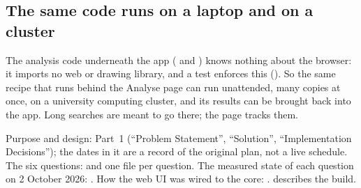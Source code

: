 \subsection*{The same code runs on a laptop and on a cluster}
The analysis code underneath the app ( and ) knows nothing
about the browser: it imports no web or drawing library, and a test enforces this
(). So the same recipe that runs behind the Analyse
page can run unattended, many copies at once, on a university computing cluster, and its
results can be brought back into the app. Long searches are meant to go there; the
 page tracks them.

\begin{underthehood}
Purpose and design:  Part~1 (``Problem Statement'',
``Solution'', ``Implementation Decisions''); the dates in it are a record of the original
plan, not a live schedule. The six questions:  and one file
per question. The measured state of each question on 2 October 2026:
. How the web UI was wired to the core:
.  describes the build.
\end{underthehood}
